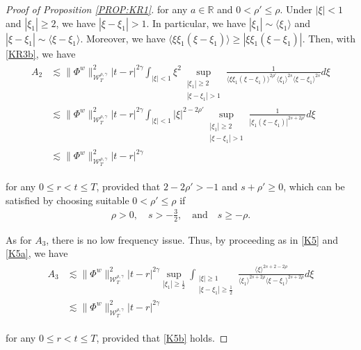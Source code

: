 \documentclass[letterpaper, 11pt,  reqno]{amsart}
\DeclareMathOperator*{\intt}{\int}
\newcommand{\1}{\hspace{0.5mm}\text{I}\hspace{0.5mm}}
\newcommand{\noi}{\noindent}
\newcommand{\R}{\mathbb{R}}
\newcommand{\g}{\gamma}
\newcommand{\les}{\lesssim}
\newcommand{\jb}[1]
{\langle #1 \rangle}
\newcommand{\W}{\mathcal{W}}
\numberwithin{equation}{section}
\numberwithin{theorem}{section}
\begin{document}
\begin{proof}[Proof of Proposition \ref{PROP:KR1}]
\noi
 for any $a\in \R$
and 
 $0<\rho'\le\rho$.
Under $|\xi| < 1$ and $|\xi_1|\ge 2$, 
we have $|\xi - \xi_1|> 1$.
In particular, we have $|\xi_1|\sim \jb{\xi_1}$
and $|\xi - \xi_1|\sim \jb{\xi- \xi_1}$.
Moreover, 
we have 
$\jb{\xi\xi_1(\xi-\xi_1)}\ge
 |\xi \xi_1(\xi- \xi_1)|$.
Then, with \eqref{KR3b}, we have
\begin{align}
\begin{split}
A_2
& \les
\|\Phi^w\|_{\W^{\rho,\g}_T}^2
|t-r|^{2\g}
\intt_{|\xi|<1}  \xi^2 
\sup_{\substack{|\xi_1|\ge 2\\|\xi - \xi_1|> 1}}
\frac{1}{\jb {\xi \xi_1 (\xi-\xi_1)}^{2\rho'}\jb {\xi_1}^{2s} \jb {\xi-\xi_1}^{2s}} d\xi
\\
& \les 
\|\Phi^w\|_{\W^{\rho,\g}_T}^2
|t-r|^{2\g}
\intt_{|\xi|<1} |\xi|^{2-2\rho' } 
\sup_{\substack{|\xi_1|\ge 2\\|\xi - \xi_1|> 1}}
\frac{1}{| \xi_1 (\xi-\xi_1)|^{2s+2\rho'} } d\xi\\
& \les 
\|\Phi^w\|_{\W^{\rho,\g}_T}^2
|t-r|^{2\g} 
\end{split}
\label{KR3c}
\end{align}



\noi
for any $0 \le r <  t \le T$, 
provided that $2-2\rho'>-1$ and $ s+\rho' \ge 0$, 
which can be satisfied by choosing 
suitable $0 < \rho' \le \rho$
if 
\begin{align}
\rho > 0, \quad s > -\frac 32,
\quad \text{and} \quad  
s\ge -\rho.
\label{KR3d}
\end{align}






As for $A_3$, 
there is no low frequency issue.
Thus, by 
proceeding as in \eqref{K5} and \eqref{K5a}, we have
\begin{align}
\begin{aligned}
A_3
& \les
\|\Phi^w\|^2_{\W_T^{\rho,\g}}|t-r |^{2\g}
\sup_{|\xi_1|\ge \frac 12}
\intt_{\substack{|\xi|\ge 1\\|\xi-\xi_1|\ge \frac 12 }}
\frac{ \jb{\xi}^{2s+2-2\rho}}{\jb{\xi_1}^{2s+2\rho}\jb{\xi - \xi_1}^{2s+2\rho}} d\xi\\
& \les
\|\Phi^w\|^2_{\W_T^{\rho,\g}}|t-r |^{2\g}
\end{aligned}
\label{KR4}
\end{align}

\noi
for any $0 \le r <  t \le T$, 
provided that
\eqref{K5b} holds.


\end{proof}
\end{document}
